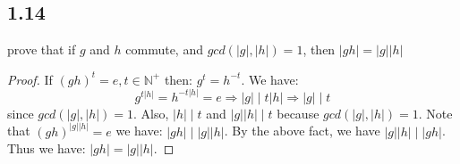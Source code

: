 \documentclass[a4paper, 12pt]{article}
\begin{document}
\subsection*{1.14} prove that if $g$ and $h$ commute, and
$gcd(|g|, |h|) = 1$, then $|gh| = |g||h|$
\begin{proof}
  If $(gh)^t = e, t\in \mathbb{N}^{+}$ then: $g^t = h^{-t}$. We have:
  $$
  g^{t|h| } = h^{-t|h| } = e \Rightarrow |g| \mid t|h| \Rightarrow |g| \mid t
  $$ since $gcd(|g|, |h|)=1$. Also, $|h| \mid t$ and $|g||h| \mid t$ because $gcd(|g|, |h|)=1$.
  Note that $(gh)^{|g||h|}=e$ we have: $|gh| \mid |g||h|$. By the above fact, we have $|g||h|\mid |gh|$. Thus 
  we have: $|gh| = |g||h|$.
\end{proof}
\end{document}
